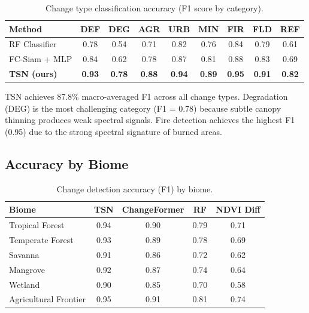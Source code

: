 \documentclass[11pt,a4paper]{article}
\begin{document}
\begin{table}[H]
\centering
\caption{Change type classification accuracy (F1 score by category).}
\label{tab:classification}
\begin{tabular}{@{}lcccccccc@{}}
\toprule
\textbf{Method} & \textbf{DEF} & \textbf{DEG} & \textbf{AGR} & \textbf{URB} & \textbf{MIN} & \textbf{FIR} & \textbf{FLD} & \textbf{REF} \\
\midrule
RF Classifier & 0.78 & 0.54 & 0.71 & 0.82 & 0.76 & 0.84 & 0.79 & 0.61 \\
FC-Siam + MLP & 0.84 & 0.62 & 0.78 & 0.87 & 0.81 & 0.88 & 0.83 & 0.69 \\
\textbf{TSN (ours)} & \textbf{0.93} & \textbf{0.78} & \textbf{0.88} & \textbf{0.94} & \textbf{0.89} & \textbf{0.95} & \textbf{0.91} & \textbf{0.82} \\
\bottomrule
\end{tabular}
\end{table}

TSN achieves 87.8\% macro-averaged F1 across all change types.
Degradation (DEG) is the most challenging category (F1 = 0.78) because subtle canopy thinning produces weak spectral signals.
Fire detection achieves the highest F1 (0.95) due to the strong spectral signature of burned areas.

\subsection{Accuracy by Biome}

\begin{table}[H]
\centering
\caption{Change detection accuracy (F1) by biome.}
\label{tab:biome_accuracy}
\begin{tabular}{@{}lcccc@{}}
\toprule
\textbf{Biome} & \textbf{TSN} & \textbf{ChangeFormer} & \textbf{RF} & \textbf{NDVI Diff} \\
\midrule
Tropical Forest & 0.94 & 0.90 & 0.79 & 0.71 \\
Temperate Forest & 0.93 & 0.89 & 0.78 & 0.69 \\
Savanna & 0.91 & 0.86 & 0.72 & 0.62 \\
Mangrove & 0.92 & 0.87 & 0.74 & 0.64 \\
Wetland & 0.90 & 0.85 & 0.70 & 0.58 \\
Agricultural Frontier & 0.95 & 0.91 & 0.81 & 0.74 \\
\bottomrule
\end{tabular}
\end{table}
\end{document}
